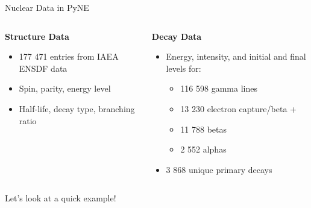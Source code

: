 \documentclass[xcolor=x11names,compress]{beamer}
\renewcommand{\(}{\begin{columns}}
\renewcommand{\)}{\end{columns}}
\newcommand{\<}[1]{\begin{column}{#1}}
\renewcommand{\>}{\end{column}}
\begin{document}
\begin{frame}{Nuclear Data in PyNE}

	\begin{columns}[T]
  	\begin{column}{0.45\textwidth}
  	    \begin{center}
  	    \textbf{Structure Data}
  	    \end{center}
        \begin{itemize}
          \item 177 471 entries from IAEA ENSDF data
          \item Spin, parity, energy level
          \item Half-life, decay type, branching ratio
        \end{itemize}
  	\end{column}
 	\begin{column}{0.45\textwidth}
        \begin{center}
  	    \textbf{Decay Data}
  	    \end{center}
        \begin{itemize}
          \item Energy, intensity, and initial and final levels for:
          \begin{itemize}
            \item 116 598 gamma lines
            \item 13 230 electron capture/beta +
            \item 11 788 betas
            \item 2 552 alphas
          \end{itemize}
          \item 3 868 unique primary decays
        \end{itemize}
  	\end{column}
	\end{columns}

    \vspace*{1 em}
    Let's look at a \alert{quick example}!

\end{frame}
\end{document}
